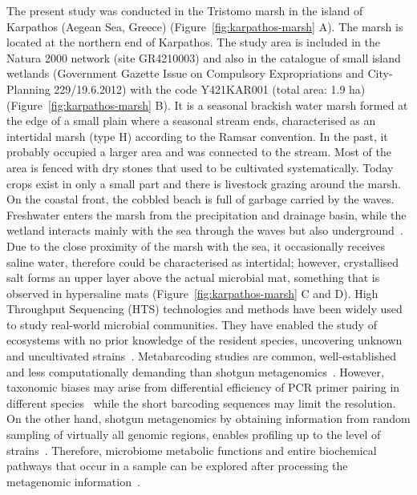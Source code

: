    The present study was conducted in the Tristomo marsh in the island of Karpathos (Aegean Sea, Greece) (Figure~\ref{fig:karpathos-marsh} A). 
   The marsh is located at the northern end of Karpathos. 
   The study area is included in the Natura 2000 network (site GR4210003) and also in the catalogue of small island wetlands 
   (Government Gazette Issue on Compulsory Expropriations and City-Planning 229/19.6.2012) with the code Y421KAR001 (total area: 1.9 ha) (Figure~\ref{fig:karpathos-marsh} B). 
   It is a seasonal brackish water marsh formed at the edge of a small plain where a seasonal stream ends, 
   characterised as an intertidal marsh (type H) according to the Ramsar convention. 
   In the past, it probably occupied a larger area and was connected to the stream. 
   Most of the area is fenced with dry stones that used to be cultivated systematically. 
   Today crops exist in only a small part and there is livestock grazing around the marsh. 
   On the coastal front, the cobbled beach is full of garbage carried by the waves. 
   Freshwater enters the marsh from the precipitation and drainage basin, while the wetland interacts mainly with the sea through the waves 
   but also underground~\citep{wwf_greece_inventory_2022}. 
   Due to the close proximity of the marsh with the sea, it occasionally receives saline water, therefore could be characterised as intertidal; 
   however, crystallised salt forms an upper layer above the actual microbial mat, something that is observed in hypersaline mats (Figure~\ref{fig:karpathos-marsh} C and D). 
   High Throughput Sequencing (HTS) technologies and methods have been widely used to study real-world microbial communities. 
   They have enabled the study of ecosystems with no prior knowledge of the resident species, uncovering unknown and uncultivated strains~\citep{hedlund_impact_2014}. 
   Metabarcoding studies are common, well-established and less computationally demanding than shotgun metagenomics~\citep{bell_comparing_2021}. 
   However, taxonomic biases may arise from differential efficiency of PCR primer pairing in different species~\citep{van_der_loos_biases_2021}
   while the short barcoding sequences may limit the resolution. 
   On the other hand, shotgun metagenomics by obtaining information from random sampling of virtually all genomic regions, 
   enables profiling up to the level of strains~\citep{clooney_comparing_2016, segata_road_2018, davila-ramos_review_2019}. 
   Therefore, microbiome metabolic functions and entire biochemical pathways that occur in a sample can be explored after processing 
   the metagenomic information~\citep{sharpton_introduction_2014}. 

